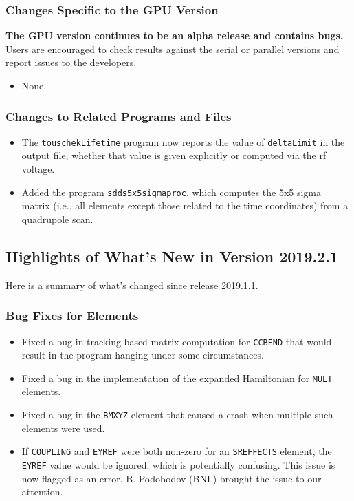 \documentclass[11pt]{article}
\begin{document}
\subsubsection{Changes Specific to the GPU Version}

{\bf The GPU version continues to be an alpha release and contains bugs.}
Users are encouraged to check results against the serial or parallel versions and report issues to the developers.

\begin{itemize}
\item None.
\end{itemize}

\subsubsection{Changes to Related Programs and Files}

\begin{itemize}
\item The \verb|touschekLifetime| program now reports the value of \verb|deltaLimit| in the output file, whether that
  value is given explicitly or computed via the rf voltage.
\item Added the program \verb|sdds5x5sigmaproc|, which computes the 5x5 sigma matrix (i.e., all elements except those
  related to the time coordinates) from a quadrupole scan.
\end{itemize}

\subsection{Highlights of What's New in Version 2019.2.1}

Here is a summary of what's changed since release 2019.1.1.

\subsubsection{Bug Fixes for Elements}

\begin{itemize}
\item Fixed a bug in tracking-based matrix computation for \verb|CCBEND| that would result in the program hanging under
  some circumstances.
\item Fixed a bug in the implementation of the expanded Hamiltonian for \verb|MULT| elements.
\item Fixed a bug in the \verb|BMXYZ| element that caused a crash when multiple such elements were used.
\item If \verb|COUPLING| and \verb|EYREF| were both non-zero for an \verb|SREFFECTS| element, the \verb|EYREF|
  value would be ignored, which is potentially confusing. This issue is now flagged as an error.
  B. Podobodov (BNL) brought the issue to our attention.
\end{itemize}
\end{document}
